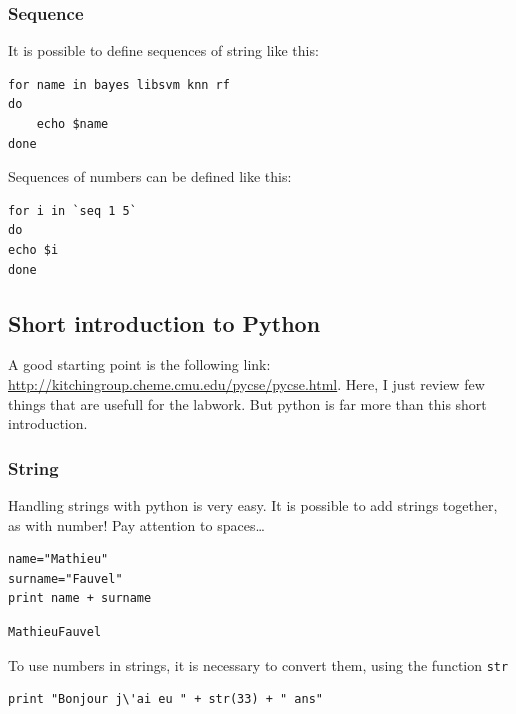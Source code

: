\documentclass[a4paper,11pt,DIV=18]{scrartcl}
\begin{document}
\subsubsection{Sequence}
\label{sec:orgheadline47}
It is possible to define sequences of string like this:

\begin{verbatim}
for name in bayes libsvm knn rf
do
    echo $name
done
\end{verbatim}

Sequences of numbers can be defined like this:

\begin{verbatim}
for i in `seq 1 5`
do
echo $i
done
\end{verbatim}
\subsection{Short introduction to Python}
\label{sec:orgheadline29}
A     good    starting     point     is     the    following     link:
\url{http://kitchingroup.cheme.cmu.edu/pycse/pycse.html}.   Here,   I   just
review few things that are usefull  for the labwork. But python is far
more than this short introduction.
\subsubsection{String}
\label{sec:orgheadline48}
Handling  strings with  python is  very easy.  It is  possible to  add
strings together, as with number! Pay attention to spaces\ldots{}

\begin{verbatim}
name="Mathieu"
surname="Fauvel"
print name + surname
\end{verbatim}

\begin{verbatim}
MathieuFauvel
\end{verbatim}

To use numbers in strings, it is necessary to convert them, using the function \texttt{str}

\begin{verbatim}
print "Bonjour j\'ai eu " + str(33) + " ans"
\end{verbatim}
\end{document}
